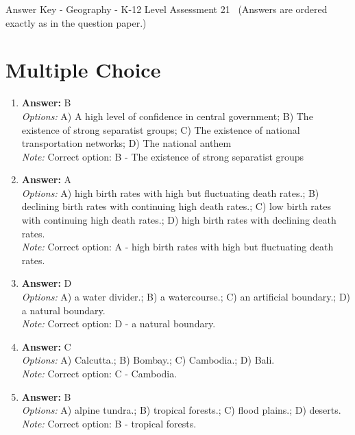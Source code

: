 \documentclass[12pt]{article}
\begin{document}
\begin{center}
Answer Key - Geography - K-12 Level Assessment 21 \
\small (Answers are ordered exactly as in the question paper.)
\end{center}

\section*{Multiple Choice}
\begin{enumerate}[label=\arabic*.]
\item \textbf{Answer:} B
\\ \textit{Options:} A) A high level of confidence in central government; B) The existence of strong separatist groups; C) The existence of national transportation networks; D) The national anthem
\\ \textit{Note:} Correct option: B - The existence of strong separatist groups
\item \textbf{Answer:} A
\\ \textit{Options:} A) high birth rates with high but fluctuating death rates.; B) declining birth rates with continuing high death rates.; C) low birth rates with continuing high death rates.; D) high birth rates with declining death rates.
\\ \textit{Note:} Correct option: A - high birth rates with high but fluctuating death rates.
\item \textbf{Answer:} D
\\ \textit{Options:} A) a water divider.; B) a watercourse.; C) an artificial boundary.; D) a natural boundary.
\\ \textit{Note:} Correct option: D - a natural boundary.
\item \textbf{Answer:} C
\\ \textit{Options:} A) Calcutta.; B) Bombay.; C) Cambodia.; D) Bali.
\\ \textit{Note:} Correct option: C - Cambodia.
\item \textbf{Answer:} B
\\ \textit{Options:} A) alpine tundra.; B) tropical forests.; C) flood plains.; D) deserts.
\\ \textit{Note:} Correct option: B - tropical forests.
\end{enumerate}
\end{document}
